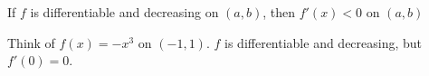 \documentclass{ximera}
\author{Steven Gubkin\and Nela Lakos}
\begin{document}
\begin{exercise}


	If $f$ is differentiable and decreasing on $(a,b)$, then $f'(x)<0$ on $(a,b)$
	\begin{hint}
Think of $f(x)=-x^3$ on $(-1,1)$. $f$ is differentiable and decreasing, but $f'(0)=0$.
\end{hint}	
	\begin{multipleChoice}	
	\end{multipleChoice}

\end{exercise}
\end{document}

